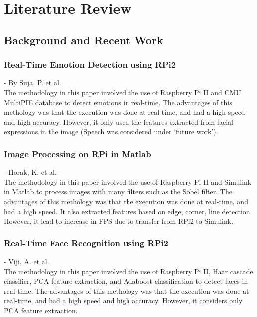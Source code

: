 \chapter{Literature Review}

\section{Background and Recent Work}

\subsection{Real-Time Emotion Detection using RPi2}
- By Suja, P. et al. \cite{suja2016} \\
The methodology in this paper involved the use of Raspberry Pi II and CMU MultiPIE database to detect emotions in real-time. The advantages of this methology was that the execution was done at real-time, and had a high speed and high accuracy. However, it only used the features extracted from facial expressions in the image (Speech was considered under `future work').

\subsection{Image Processing on RPi in Matlab}
- Horak, K. et al. \cite{horak2015} \\
The methodology in this paper involved the use of Raspberry Pi II and Simulink in Matlab to process images with many filters such as the Sobel filter. The advantages of this methology was that the execution was done at real-time, and had a high speed. It also extracted features based on edge, corner, line detection. However, it lead to increase in FPS due to transfer from RPi2 to Simulink.

\subsection{Real-Time Face Recognition using RPi2}
- Viji, A. et al. \cite{viji2017} \\
The methodology in this paper involved the use of Raspberry Pi II, Haar cascade classifier, PCA feature extraction, and Adaboost classification to detect faces in real-time. The advantages of this methology was that the execution was done at real-time, and had a high speed and high accuracy. However, it considers only PCA feature extraction.

\pagebreak


